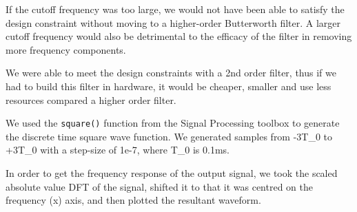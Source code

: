 \documentclass[12pt]{article}
\begin{document}
If the cutoff frequency was too large, we would not have been able to satisfy the design constraint without moving to a higher-order Butterworth filter. A larger cutoff frequency would also be detrimental to the efficacy of the filter in removing more frequency components.

We were able to meet the design constraints with a 2nd order filter, thus if we had to build this filter in hardware, it would be cheaper, smaller and use less resources compared a higher order filter.

We used the \verb|square()| function from the Signal Processing toolbox to generate the discrete time square wave function. We generated samples from -3T_0 to +3T_0 with a step-size of 1e-7, where T_0 is 0.1ms.


In order to get the frequency response of the output signal, we took the scaled absolute value DFT of the signal, shifted it to that it was centred on the frequency (x) axis, and then plotted the resultant waveform.
\end{document}
